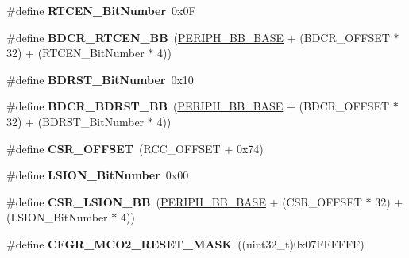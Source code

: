 \begin{DoxyCompactItemize}
\item 
\#define {\bfseries R\+T\+C\+E\+N\+\_\+\+Bit\+Number}~0x0F\hypertarget{group___r_c_c_ga9302c551752124766afc4cee65436405}{}\label{group___r_c_c_ga9302c551752124766afc4cee65436405}

\item 
\#define {\bfseries B\+D\+C\+R\+\_\+\+R\+T\+C\+E\+N\+\_\+\+BB}~(\hyperlink{group___peripheral__memory__map_gaed7efc100877000845c236ccdc9e144a}{P\+E\+R\+I\+P\+H\+\_\+\+B\+B\+\_\+\+B\+A\+SE} + (B\+D\+C\+R\+\_\+\+O\+F\+F\+S\+ET $\ast$ 32) + (R\+T\+C\+E\+N\+\_\+\+Bit\+Number $\ast$ 4))\hypertarget{group___r_c_c_gaf70aaf70b0752ccb3a60307b2fb46038}{}\label{group___r_c_c_gaf70aaf70b0752ccb3a60307b2fb46038}

\item 
\#define {\bfseries B\+D\+R\+S\+T\+\_\+\+Bit\+Number}~0x10\hypertarget{group___r_c_c_gae6718158034388d8fde8caaa28ffe8b9}{}\label{group___r_c_c_gae6718158034388d8fde8caaa28ffe8b9}

\item 
\#define {\bfseries B\+D\+C\+R\+\_\+\+B\+D\+R\+S\+T\+\_\+\+BB}~(\hyperlink{group___peripheral__memory__map_gaed7efc100877000845c236ccdc9e144a}{P\+E\+R\+I\+P\+H\+\_\+\+B\+B\+\_\+\+B\+A\+SE} + (B\+D\+C\+R\+\_\+\+O\+F\+F\+S\+ET $\ast$ 32) + (B\+D\+R\+S\+T\+\_\+\+Bit\+Number $\ast$ 4))\hypertarget{group___r_c_c_ga892fdf297b85b85cbaf0723649b31818}{}\label{group___r_c_c_ga892fdf297b85b85cbaf0723649b31818}

\item 
\#define {\bfseries C\+S\+R\+\_\+\+O\+F\+F\+S\+ET}~(R\+C\+C\+\_\+\+O\+F\+F\+S\+ET + 0x74)\hypertarget{group___r_c_c_ga984cbe73312b6d3d355c5053763d499a}{}\label{group___r_c_c_ga984cbe73312b6d3d355c5053763d499a}

\item 
\#define {\bfseries L\+S\+I\+O\+N\+\_\+\+Bit\+Number}~0x00\hypertarget{group___r_c_c_ga3f9dbe50769ce2a63ae12520433b9b40}{}\label{group___r_c_c_ga3f9dbe50769ce2a63ae12520433b9b40}

\item 
\#define {\bfseries C\+S\+R\+\_\+\+L\+S\+I\+O\+N\+\_\+\+BB}~(\hyperlink{group___peripheral__memory__map_gaed7efc100877000845c236ccdc9e144a}{P\+E\+R\+I\+P\+H\+\_\+\+B\+B\+\_\+\+B\+A\+SE} + (C\+S\+R\+\_\+\+O\+F\+F\+S\+ET $\ast$ 32) + (L\+S\+I\+O\+N\+\_\+\+Bit\+Number $\ast$ 4))\hypertarget{group___r_c_c_gaa253e36e7e5fb02998c0e4d0388abc52}{}\label{group___r_c_c_gaa253e36e7e5fb02998c0e4d0388abc52}

\item 
\#define {\bfseries C\+F\+G\+R\+\_\+\+M\+C\+O2\+\_\+\+R\+E\+S\+E\+T\+\_\+\+M\+A\+SK}~((uint32\+\_\+t)0x07\+F\+F\+F\+F\+F\+F)\hypertarget{group___r_c_c_gabd7dd9cf31a9cc27fd9c0c1624f9a298}{}\label{group___r_c_c_gabd7dd9cf31a9cc27fd9c0c1624f9a298}


\end{DoxyCompactItemize}
